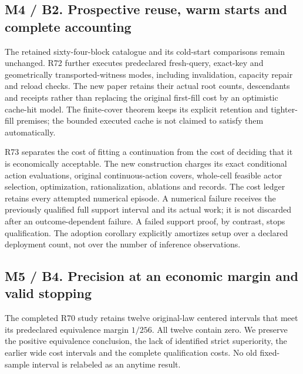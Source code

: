 \hypertarget{m4-b2.-prospective-reuse-warm-starts-and-complete-accounting}{%
\subsection{M4 / B2. Prospective reuse, warm starts and complete
accounting}\label{m4-b2.-prospective-reuse-warm-starts-and-complete-accounting}}

The retained sixty-four-block catalogue and its cold-start comparisons
remain unchanged. R72 further executes predeclared fresh-query,
exact-key and geometrically transported-witness modes, including
invalidation, capacity repair and reload checks. The new paper retains
their actual root counts, descendants and receipts rather than replacing
the original first-fill cost by an optimistic cache-hit model. The
finite-cover theorem keeps its explicit retention and tighter-fill
premises; the bounded executed cache is not claimed to satisfy them
automatically.

R73 separates the cost of fitting a continuation from the cost of
deciding that it is economically acceptable. The new construction
charges its exact conditional action evaluations, original
continuous-action covers, whole-cell feasible actor selection,
optimization, rationalization, ablations and records. The cost ledger
retains every attempted numerical episode. A numerical failure receives
the previously qualified full support interval and its actual work; it
is not discarded after an outcome-dependent failure. A failed support
proof, by contrast, stops qualification. The adoption corollary
explicitly amortizes setup over a declared deployment count, not over
the number of inference observations.

\hypertarget{m5-b4.-precision-at-an-economic-margin-and-valid-stopping}{%
\subsection{M5 / B4. Precision at an economic margin and valid
stopping}\label{m5-b4.-precision-at-an-economic-margin-and-valid-stopping}}

The completed R70 study retains twelve original-law centered intervals
that meet its predeclared equivalence margin \(1/256\). All twelve
contain zero. We preserve the positive equivalence conclusion, the lack
of identified strict superiority, the earlier wide cost intervals and
the complete qualification costs. No old fixed-sample interval is
relabeled as an anytime result.

